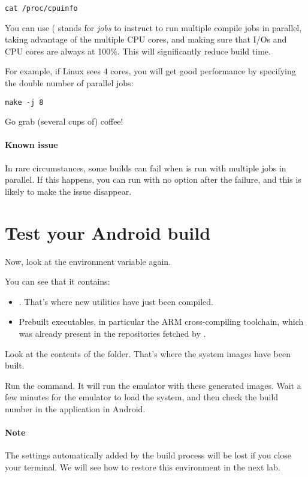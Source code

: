 \begin{verbatim}
cat /proc/cpuinfo
\end{verbatim}

You can use  ( stands for {\it jobs} to instruct
 to run multiple compile jobs in parallel, taking advantage
of the multiple CPU cores, and making sure that I/Os and CPU cores are
always at 100\%. This will significantly reduce build time.

For example, if Linux sees 4 cores, you will get good performance by
specifying the double number of parallel jobs:

\begin{verbatim}
make -j 8
\end{verbatim}

Go grab (several cups of) coffee!

\paragraph{Known issue}
In rare circumstances, some builds can fail when  is run
with multiple jobs in parallel. If this happens, you can run
 with no option after the failure, and this is likely to
make the issue disappear.

\section{Test your Android build}

Now, look at the  environment variable again.

You can see that it contains:
\begin{itemize}
\item
  .
  That's where new utilities have just been compiled.
\item Prebuilt executables, in particular the ARM cross-compiling
  toolchain, which was already present in the repositories fetched by
  .
\end{itemize}

Look at the contents of the  folder.
That's where the system images have been built.

Run the  command. It will run the emulator with these
generated images.  Wait a few minutes for the emulator to load the
system, and then check the build number in the 
application in Android.

\paragraph{Note}
The  settings automatically added by the build process will
be lost if you close your terminal. We will see how to restore this
environment in the next lab.
